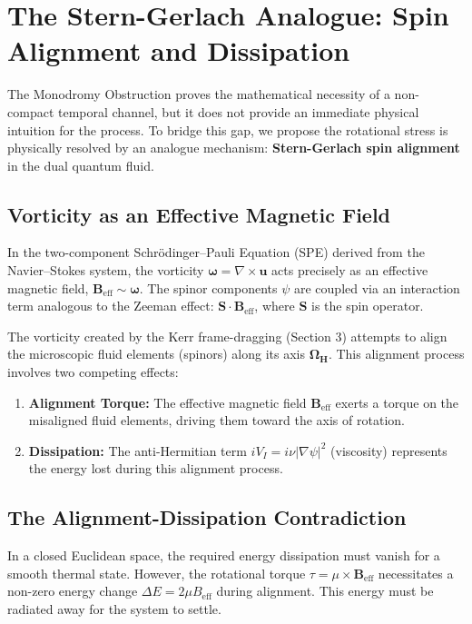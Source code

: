 \documentclass[11pt]{article}
\begin{document}
\section{The Stern-Gerlach\cite{SternGerlach1922} Analogue: Spin Alignment and Dissipation}


The Monodromy Obstruction proves the mathematical necessity of a non-compact temporal channel, but it does not provide an immediate physical intuition for the process. To bridge this gap, we propose the rotational stress is physically resolved by an analogue mechanism: \textbf{Stern-Gerlach\cite{SternGerlach1922} spin alignment} in the dual quantum fluid.

\subsection{Vorticity as an Effective Magnetic Field}

In the two-component Schrödinger--Pauli Equation (SPE) derived from the Navier--Stokes system, the vorticity $\mathbf{\omega} = \nabla \times \mathbf{u}$ acts precisely as an effective magnetic field, $\mathbf{B}_{\text{eff}} \sim \mathbf{\omega}$. The spinor components $\psi$ are coupled via an interaction term analogous to the Zeeman effect: $\mathbf{S} \cdot \mathbf{B}_{\text{eff}}$, where $\mathbf{S}$ is the spin operator.

The vorticity created by the Kerr frame-dragging (Section 3) attempts to align the microscopic fluid elements (spinors) along its axis $\mathbf{\Omega_H}$. This alignment process involves two competing effects:

\begin{enumerate}
    \item \textbf{Alignment Torque:} The effective magnetic field $\mathbf{B}_{\text{eff}}$ exerts a torque on the misaligned fluid elements, driving them toward the axis of rotation.
    \item \textbf{Dissipation:} The anti-Hermitian term $iV_I = i\nu|\nabla\psi|^2$ (viscosity) represents the energy lost during this alignment process.
\end{enumerate}

\subsection{The Alignment-Dissipation Contradiction}

In a closed Euclidean space, the required energy dissipation must vanish for a smooth thermal state. However, the rotational torque $\tau = \mu \times \mathbf{B}_{\text{eff}}$ necessitates a non-zero energy change $\Delta E = 2\mu B_{\text{eff}}$ during alignment. This energy must be radiated away for the system to settle.
\end{document}

